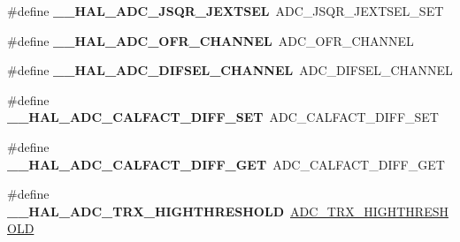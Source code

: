 \begin{DoxyCompactItemize}
\item 
\mbox{\label{group___h_a_l___a_d_c___aliased___macros_ga362667abab4da4e626e45c9aef345d85}} 
\#define {\bfseries \+\_\+\+\_\+\+H\+A\+L\+\_\+\+A\+D\+C\+\_\+\+J\+S\+Q\+R\+\_\+\+J\+E\+X\+T\+S\+EL}~A\+D\+C\+\_\+\+J\+S\+Q\+R\+\_\+\+J\+E\+X\+T\+S\+E\+L\+\_\+\+S\+ET
\item 
\mbox{\label{group___h_a_l___a_d_c___aliased___macros_gad3ba77f5090921040fa9a63ff8d31241}} 
\#define {\bfseries \+\_\+\+\_\+\+H\+A\+L\+\_\+\+A\+D\+C\+\_\+\+O\+F\+R\+\_\+\+C\+H\+A\+N\+N\+EL}~A\+D\+C\+\_\+\+O\+F\+R\+\_\+\+C\+H\+A\+N\+N\+EL
\item 
\mbox{\label{group___h_a_l___a_d_c___aliased___macros_ga697c5bcf01d90462bf0c65c1434204a2}} 
\#define {\bfseries \+\_\+\+\_\+\+H\+A\+L\+\_\+\+A\+D\+C\+\_\+\+D\+I\+F\+S\+E\+L\+\_\+\+C\+H\+A\+N\+N\+EL}~A\+D\+C\+\_\+\+D\+I\+F\+S\+E\+L\+\_\+\+C\+H\+A\+N\+N\+EL
\item 
\mbox{\label{group___h_a_l___a_d_c___aliased___macros_ga0d6a948351847da8e821fd673cd5395c}} 
\#define {\bfseries \+\_\+\+\_\+\+H\+A\+L\+\_\+\+A\+D\+C\+\_\+\+C\+A\+L\+F\+A\+C\+T\+\_\+\+D\+I\+F\+F\+\_\+\+S\+ET}~A\+D\+C\+\_\+\+C\+A\+L\+F\+A\+C\+T\+\_\+\+D\+I\+F\+F\+\_\+\+S\+ET
\item 
\mbox{\label{group___h_a_l___a_d_c___aliased___macros_ga04d8142122bd9275a1219043edc63d98}} 
\#define {\bfseries \+\_\+\+\_\+\+H\+A\+L\+\_\+\+A\+D\+C\+\_\+\+C\+A\+L\+F\+A\+C\+T\+\_\+\+D\+I\+F\+F\+\_\+\+G\+ET}~A\+D\+C\+\_\+\+C\+A\+L\+F\+A\+C\+T\+\_\+\+D\+I\+F\+F\+\_\+\+G\+ET
\item 
\mbox{\label{group___h_a_l___a_d_c___aliased___macros_ga33afa59f288d4671512aed3dfb8f70b7}} 
\#define {\bfseries \+\_\+\+\_\+\+H\+A\+L\+\_\+\+A\+D\+C\+\_\+\+T\+R\+X\+\_\+\+H\+I\+G\+H\+T\+H\+R\+E\+S\+H\+O\+LD}~\hyperlink{group___a_d_c___private___macros_gaa93c21f107b7c38b524cd72b12ec18ac}{A\+D\+C\+\_\+\+T\+R\+X\+\_\+\+H\+I\+G\+H\+T\+H\+R\+E\+S\+H\+O\+LD}
\item 
\mbox{\label{group___h_a_l___a_d_c___aliased___macros_ga0f83fc077ad488745139c8e24641d437}} 

\end{DoxyCompactItemize}
